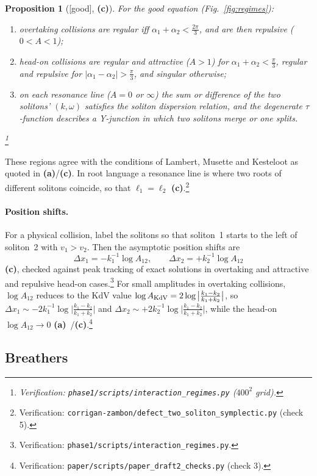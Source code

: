 \documentclass[11pt,a4paper]{article}
\newcommand{\lab}[1]{{\normalfont\sffamily\footnotesize\bfseries(#1)}}
\newcommand{\La}{\lab{a}}
\newcommand{\Lc}{\lab{c}}
\newcommand{\eqtag}[2]{{\normalfont\sffamily\footnotesize\textcolor{#1}{[#2]}}}
\newcommand{\Good}{\eqtag{teal!70!black}{good}}
\newcommand{\scr}[1]{\nolinkurl{#1}}
\newcommand{\chk}[1]{\footnote{\raggedright Verification: #1.}}
\newtheorem{proposition}{Proposition}[section]
\theoremstyle{remark}
\begin{document}
\begin{proposition}[\Good, \Lc]\label{prop:regimes}
For the good equation (Fig.~\ref{fig:regimes}):
\begin{enumerate}
\item overtaking collisions are regular iff $\alpha_1+\alpha_2<\tfrac{2\pi}3$, and are then repulsive ($0<A<1$);
\item head-on collisions are regular and attractive ($A>1$) for $\alpha_1+\alpha_2<\tfrac\pi3$, regular and repulsive for $|\alpha_1-\alpha_2|>\tfrac\pi3$, and singular otherwise;
\item on each resonance line ($A=0$ or $\infty$) the sum or difference of the two solitons' $(k,\omega)$ satisfies the soliton dispersion relation, and the degenerate $\tau$-function describes a Y-junction in which two solitons merge or one splits.
\end{enumerate}
\chk{\scr{phase1/scripts/interaction_regimes.py} ($400^2$ grid)}
\end{proposition}
These regions agree with the conditions of Lambert, Musette and Kesteloot as quoted in \cite[(29)--(33)]{BD} \La/\Lc. In root language a resonance line is where two roots of different solitons coincide, so that $\ell_1=\ell_2$ \Lc.\chk{\scr{corrigan-zambon/defect_two_soliton_symplectic.py} (check 5)}

\paragraph{Position shifts.} For a physical collision, label the solitons so that soliton~1 starts to the left of soliton~2 with $v_1>v_2$. Then the asymptotic position shifts are
\begin{equation}\label{eq:shifts}
\Delta x_1=-k_1^{-1}\log A_{12},\qquad \Delta x_2=+k_2^{-1}\log A_{12}
\end{equation}
\Lc, checked against peak tracking of exact solutions in overtaking and attractive and repulsive head-on cases.\chk{\scr{phase1/scripts/interaction_regimes.py}} For small amplitudes in overtaking collisions, $\log A_{12}$ reduces to the KdV value $\log A_{\rm KdV}=2\log\big|\frac{k_1-k_2}{k_1+k_2}\big|$, so $\Delta x_1\sim-2k_1^{-1}\log\big|\frac{k_1-k_2}{k_1+k_2}\big|$ and $\Delta x_2\sim+2k_2^{-1}\log\big|\frac{k_1-k_2}{k_1+k_2}\big|$, while the head-on $\log A_{12}\to0$ \La~\cite{BD}/\Lc.\chk{\scr{paper/scripts/paper_draft2_checks.py} (check 3)}

\subsection{Breathers}\label{sec:breathers}
\end{document}
